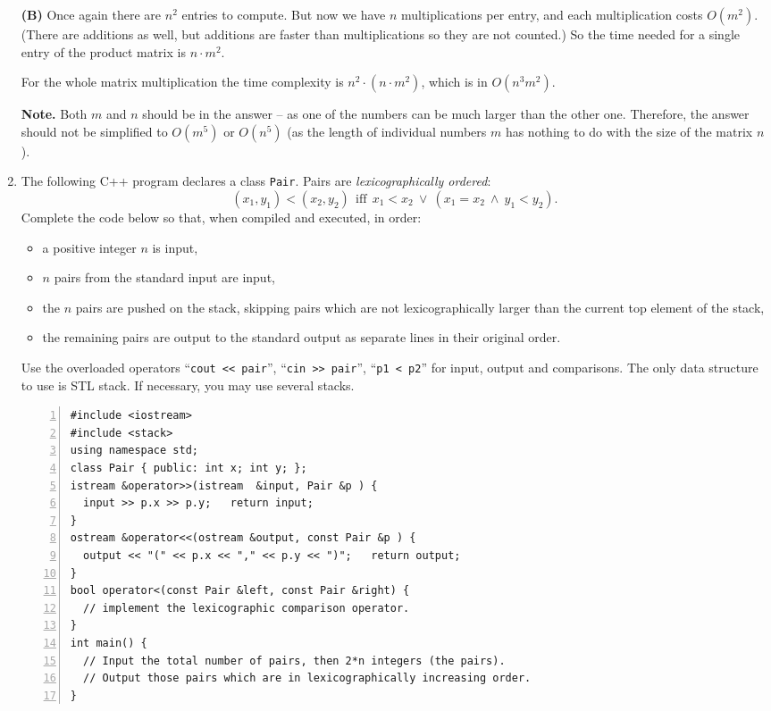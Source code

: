 \documentclass[a4paper,12pt]{article}
\begin{document}
\begin{enumerate}
{{\bf (B)} Once again there are $n^2$ entries to compute. But now we have $n$ multiplications per entry, 
and each multiplication costs $O(m^2)$. (There are additions as well, but additions are
faster than multiplications so they are not counted.) So the time needed for a single 
entry of the product matrix is $n \cdot m^2$.

For the whole matrix multiplication the time complexity is $n^2 \cdot (n \cdot m^2)$, which 
is in $O(n^3 m^2)$. 

{\bf Note.} Both $m$ and $n$ should be in the answer -- as one of the numbers can be much larger
than the other one. Therefore, the answer should not be simplified to $O(m^5)$ or $O(n^5)$
(as the length of individual numbers $m$ has nothing to do with the size of the matrix $n$).
}






\item \label{q:q4}

The following C++ program declares a class {\tt Pair}. 
Pairs are {\em lexicographically ordered}: 
\[
(x_1, y_1) < (x_2, y_2)\ \ \text{iff}\ \ x_1 < x_2\ \vee\ (x_1 = x_2\ \wedge\ y_1 < y_2).
\]
Complete the code below so that, when compiled and executed, in order:
\begin{itemize}
\item a positive integer $n$ is input,
\item $n$ pairs from the standard input are input,
\item the $n$ pairs are pushed on the stack, skipping pairs which are not lexicographically larger than the current top element of the stack,
\item the remaining pairs are output to the standard output as separate lines in their original order.
\end{itemize}

Use the overloaded operators ``{\tt cout << pair}'', ``{\tt cin >> pair}'', ``{\tt p1 < p2}''
for input, output and comparisons. The only data structure to use is STL stack. 
If necessary, you may use several stacks.

\begin{Verbatim}[frame=single,numbers=left]
#include <iostream>
#include <stack>
using namespace std;
class Pair { public: int x; int y; }; 
istream &operator>>(istream  &input, Pair &p ) { 
  input >> p.x >> p.y;   return input;            
}
ostream &operator<<(ostream &output, const Pair &p ) { 
  output << "(" << p.x << "," << p.y << ")";   return output;            
}
bool operator<(const Pair &left, const Pair &right) {
  // implement the lexicographic comparison operator.
}
int main() {
  // Input the total number of pairs, then 2*n integers (the pairs). 
  // Output those pairs which are in lexicographically increasing order.
}
\end{Verbatim}


\end{enumerate}
\end{document}
